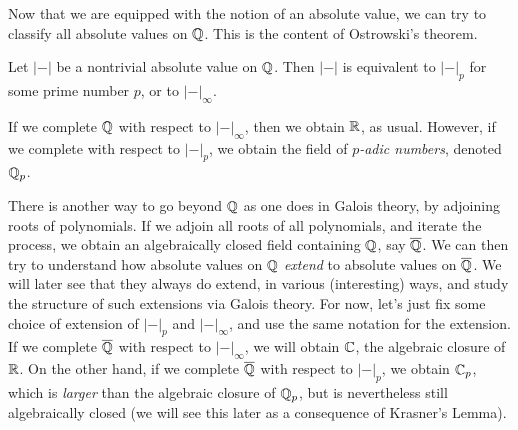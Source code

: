 Now that we are equipped with the notion of an absolute value, we can try to classify all absolute values on $\mathbb{Q}$.
This is the content of Ostrowski's theorem.
\begin{theorem}[Ostrowski]
  Let $|-|$ be a nontrivial absolute value on $\mathbb{Q}$.
  Then $|-|$ is equivalent to $|-|_{p}$ for some prime number $p$, or to $|-|_{\infty}$.
\end{theorem}

If we complete $\mathbb{Q}$ with respect to $|-|_{\infty}$, then we obtain $\mathbb{R}$, as usual.
However, if we complete with respect to $|-|_{p}$, we obtain the field of \emph{$p$-adic numbers}, denoted $\mathbb{Q}_{p}$.

There is another way to go beyond $\mathbb{Q}$ as one does in Galois theory, by adjoining roots of polynomials.
If we adjoin all roots of all polynomials, and iterate the process, we obtain an algebraically closed field containing $\mathbb{Q}$, say $\overline {\mathbb{Q}}$.
We can then try to understand how absolute values on $\mathbb{Q}$ \emph{extend} to absolute values on $\overline{\mathbb{Q}}$. We will later see that they always do extend, in various (interesting) ways, and study the structure of such extensions via Galois theory.
For now, let's just fix some choice of extension of $|-|_{p}$ and $|-|_{\infty}$, and use the same notation for the extension.
If we complete $\overline{\mathbb{Q}}$ with respect to $|-|_{\infty}$, we will obtain $\mathbb{C}$, the algebraic closure of $\mathbb{R}$.
On the other hand, if we complete $\overline{\mathbb{Q}}$ with respect to $|-|_{p}$, we obtain $\mathbb{C}_{p}$, which is \emph{larger} than the algebraic closure of $\mathbb{Q}_{p}$, but is nevertheless still algebraically closed (we will see this later as a consequence of Krasner's Lemma).



